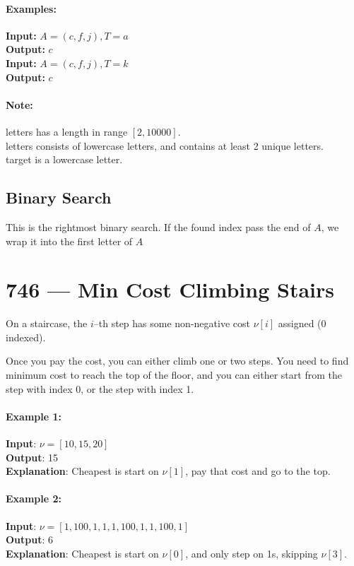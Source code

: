 \documentclass[a4paper,12pt]{article}
\begin{document}
\paragraph{Examples:}
\begin{flushleft}
\textbf{Input:} $A=(c,f,j), T=a$
\\
\textbf{Output:} $c$
\\
\textbf{Input:} $A=(c,f,j), T=k$
\\
\textbf{Output:} $c$
\end{flushleft}
\paragraph{Note:}
\begin{flushleft}
letters has a length in range $[2, 10000]$.
\\
letters consists of lowercase letters, and contains at least 2 unique letters.
\\
target is a lowercase letter.
\end{flushleft}
\subsection{Binary Search}
This is the rightmost binary search. If the found index pass the end of $A$, we wrap it into the first letter of $A$


\section{746 --- Min Cost Climbing Stairs}
On a staircase, the $i$--th step has some non-negative cost $\nu[i]$ assigned (0 indexed).
\par
Once you pay the cost, you can either climb one or two steps. You need to find minimum cost to reach the top of the floor, and you can either start from the step with index 0, or the step with index 1.
\paragraph{Example 1:}
\begin{flushleft}
\textbf{Input}: $\nu = [10, 15, 20]$
\\
\textbf{Output}: 15
\\
\textbf{Explanation}: Cheapest is start on $\nu[1]$, pay that cost and go to the top.
\end{flushleft}
\paragraph{Example 2:}
\begin{flushleft}
\textbf{Input}: $\nu = [1, 100, 1, 1, 1, 100, 1, 1, 100, 1]$
\\
\textbf{Output}: 6
\\
\textbf{Explanation}: Cheapest is start on $\nu[0]$, and only step on 1s, skipping $\nu[3]$.
\end{flushleft}
\end{document}
